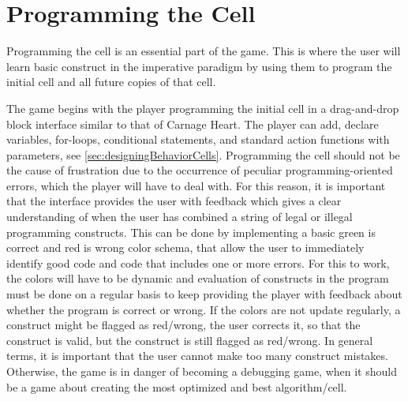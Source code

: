 \section{Programming the Cell}

Programming the cell is an essential part of the game. This is where the user will learn basic construct in the imperative paradigm by using them to program the initial cell and all future copies of that cell.\newline

The game begins with the player programming the initial cell in a drag-and-drop block interface similar to that of Carnage Heart.
The player can add, declare variables, for-loops, conditional statements, and standard action functions with parameters, see \autoref{sec:designingBehaviorCells}.
Programming the cell should not be the cause of frustration due to the occurrence of peculiar programming-oriented errors, which the player will have to deal with.
For this reason, it is important that the interface provides the user with feedback which gives a clear understanding of when the user has combined a string of legal or illegal programming constructs.
This can be done by implementing a basic green is correct and red is wrong color schema, that allow the user to immediately identify good code and code that includes one or more errors.
For this to work, the colors will have to be dynamic and evaluation of constructs in the program must be done on a regular basis to keep providing the player with feedback about whether the program is correct or wrong.
If the colors are not update regularly, a construct might be flagged as red/wrong, the user corrects it, so that the construct is valid, but the construct is still flagged as red/wrong.
In general terms, it is important that the user cannot make too many construct mistakes.
Otherwise, the game is in danger of becoming a debugging game, when it should be a game about creating the most optimized and best algorithm/cell.